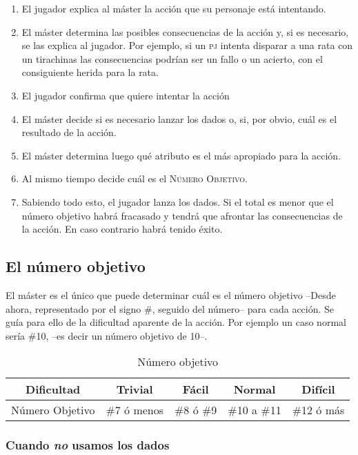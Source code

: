 \begin{enumerate}
\item El jugador explica al máster la acción que su personaje está intentando.
\item El máster determina las posibles consecuencias de la acción y, si es necesario, se las explica al jugador. Por ejemplo, si un \textsc{pj} intenta disparar a una rata con un tirachinas las consecuencias podrían ser un fallo o un acierto, con el consiguiente herida para la rata.
\item El jugador confirma que quiere intentar la acción
\item El máster decide si es necesario lanzar los dados o, si, por obvio, cuál es el resultado de la acción.
\item El máster determina luego qué atributo es el más apropiado para la acción.
\item Al mismo tiempo decide cuál es el \textsc{Número Objetivo}.
\item Sabiendo todo esto, el jugador lanza los dados. Si el total es menor que el número objetivo habrá fracasado y tendrá que afrontar las consecuencias de la acción. En caso contrario habrá tenido éxito.
\end{enumerate}

\subsection{El número objetivo}
El máster es el único que puede determinar cuál es el número objetivo --Desde ahora, representado por el signo \#, seguido del número--  para cada acción. Se guía para ello de la dificultad aparente de la acción. Por ejemplo un caso normal sería \#10, --es decir un número objetivo de 10--.

\begin{table}[h]
\centering
\begin{tabular}{ccccc}
\toprule
Dificultad&Trivial&Fácil&Normal&Difícil\\\midrule
Número Objetivo&\#7 ó menos&\#8 ó \#9&\#10 a \#11&\#12 ó más\\\midrule
\bottomrule
\end{tabular}
\caption{Número objetivo}
\end{table}

\subsubsection*{Cuando \emph{no} usamos los dados}

